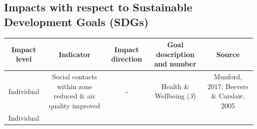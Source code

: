 \documentclass[
]{book}
\begin{document}
\hypertarget{impacts-with-respect-to-sustainable-development-goals-sdgs-6}{%
\subsection*{Impacts with respect to Sustainable Development Goals (SDGs)}\label{impacts-with-respect-to-sustainable-development-goals-sdgs-6}}

\begin{longtable}[]{@{}ccccc@{}}
\toprule
\begin{minipage}[b]{0.17\columnwidth}\centering
Impact level\strut
\end{minipage} & \begin{minipage}[b]{0.16\columnwidth}\centering
Indicator\strut
\end{minipage} & \begin{minipage}[b]{0.17\columnwidth}\centering
Impact direction\strut
\end{minipage} & \begin{minipage}[b]{0.17\columnwidth}\centering
Goal description and number\strut
\end{minipage} & \begin{minipage}[b]{0.17\columnwidth}\centering
Source\strut
\end{minipage}\tabularnewline
\midrule
\endhead
\begin{minipage}[t]{0.17\columnwidth}\centering
Individual\strut
\end{minipage} & \begin{minipage}[t]{0.16\columnwidth}\centering
Social contacts within zone reduced \& air quality improved\strut
\end{minipage} & \begin{minipage}[t]{0.17\columnwidth}\centering
\textbf{\textasciitilde{}}\strut
\end{minipage} & \begin{minipage}[t]{0.17\columnwidth}\centering
Health \& Wellbeing (\emph{3})\strut
\end{minipage} & \begin{minipage}[t]{0.17\columnwidth}\centering
Munford, 2017; Beevers \& Carslaw, 2005\strut
\end{minipage}\tabularnewline
\begin{minipage}[t]{0.17\columnwidth}\centering
Individual\strut
\end{minipage} & \begin{minipage}[t]{0.16\columnwidth}\centering

\end{minipage}
\end{longtable}
\end{document}
